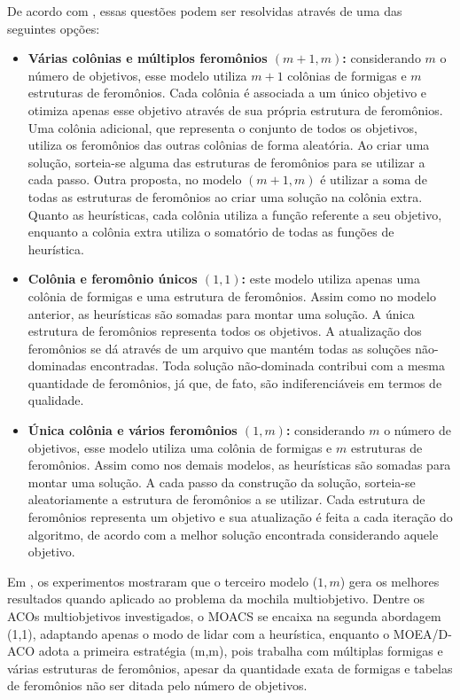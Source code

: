 De acordo com \cite{Alaya2007}, essas questões podem ser resolvidas através de uma das seguintes opções:

\begin{itemize}
	\item \textbf{Várias colônias e múltiplos feromônios $(m+1, m)$:} considerando $m$ o número de objetivos, esse modelo utiliza $m + 1$ colônias de formigas e $m$ estruturas de feromônios. Cada colônia é associada a um único objetivo e otimiza apenas esse objetivo através de sua própria estrutura de feromônios. Uma colônia adicional, que representa o conjunto de todos os objetivos, utiliza os feromônios das outras colônias de forma aleatória. Ao criar uma solução, sorteia-se alguma das estruturas de feromônios para se utilizar a cada passo. Outra proposta, no modelo $(m+1, m)$ é utilizar a soma de todas as estruturas de feromônios ao criar uma solução na colônia extra. Quanto as heurísticas, cada colônia utiliza a função referente a seu objetivo, enquanto a colônia extra utiliza o somatório de todas as funções de heurística.
	\item \textbf{Colônia e feromônio únicos $(1,1)$:} este modelo utiliza apenas uma colônia de formigas e uma estrutura de feromônios. Assim como no modelo anterior, as heurísticas são somadas para montar uma solução. A única estrutura de feromônios representa todos os objetivos. A atualização dos feromônios se dá através de um arquivo que mantém todas as soluções não-dominadas encontradas. Toda solução não-dominada contribui com a mesma quantidade de feromônios, já que, de fato, são indiferenciáveis em termos de qualidade.
	\item \textbf{Única colônia e vários feromônios $(1,m)$:} considerando $m$ o número de objetivos, esse modelo utiliza uma colônia de formigas e $m$ estruturas de feromônios. Assim como nos demais modelos, as heurísticas são somadas para montar uma solução. A cada passo da construção da solução, sorteia-se aleatoriamente a estrutura de feromônios a se utilizar. Cada estrutura de feromônios representa um objetivo e sua atualização é feita a cada iteração do algoritmo, de acordo com a melhor solução encontrada considerando aquele objetivo.
\end{itemize}

Em \cite{Alaya2007}, os experimentos mostraram que o terceiro modelo ($1,m$) gera os melhores resultados quando aplicado ao problema da mochila multiobjetivo. Dentre os ACOs multiobjetivos investigados, o MOACS se encaixa na segunda abordagem (1,1), adaptando apenas o modo de lidar com a heurística, enquanto o MOEA/D-ACO adota a primeira estratégia (m,m), pois trabalha com múltiplas formigas e várias estruturas de feromônios, apesar da quantidade exata de formigas e tabelas de feromônios não ser ditada pelo número de objetivos.


